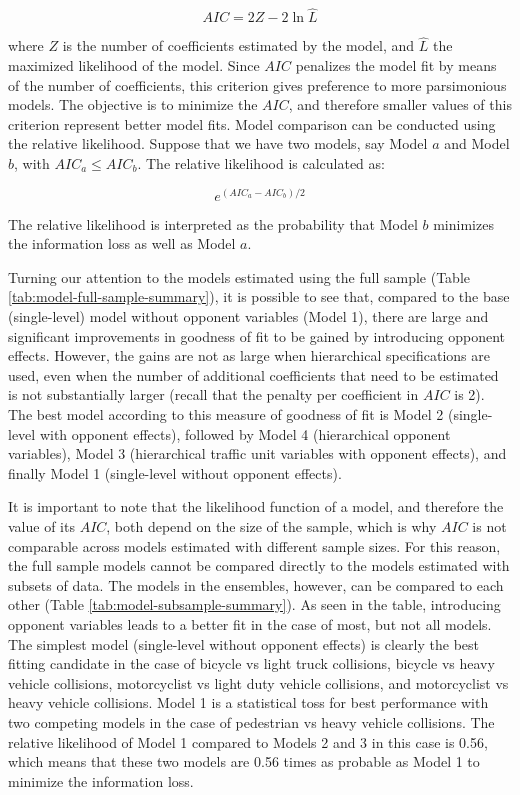 \documentclass[]{elsarticle} %
\begin{document}
\begin{equation}
\label{eq:aic}
AIC = 2Z - 2\ln{\hat{L}}
\end{equation}

\noindent where \(Z\) is the number of coefficients estimated by the
model, and \(\hat{L}\) the maximized likelihood of the model. Since
\(AIC\) penalizes the model fit by means of the number of coefficients,
this criterion gives preference to more parsimonious models. The
objective is to minimize the \(AIC\), and therefore smaller values of
this criterion represent better model fits. Model comparison can be
conducted using the relative likelihood. Suppose that we have two
models, say Model \(a\) and Model \(b\), with \(AIC_{a} \le AIC_{b}\).
The relative likelihood is calculated as:

\begin{equation}
\label{eq:relative-likelihood}
e^{(AIC_a - AIC_b)/2}
\end{equation}

The relative likelihood is interpreted as the probability that Model
\(b\) minimizes the information loss as well as Model \(a\).

Turning our attention to the models estimated using the full sample
(Table \ref{tab:model-full-sample-summary}), it is possible to see that,
compared to the base (single-level) model without opponent variables
(Model 1), there are large and significant improvements in goodness of
fit to be gained by introducing opponent effects. However, the gains are
not as large when hierarchical specifications are used, even when the
number of additional coefficients that need to be estimated is not
substantially larger (recall that the penalty per coefficient in \(AIC\)
is 2). The best model according to this measure of goodness of fit is
Model 2 (single-level with opponent effects), followed by Model 4
(hierarchical opponent variables), Model 3 (hierarchical traffic unit
variables with opponent effects), and finally Model 1 (single-level
without opponent effects).

It is important to note that the likelihood function of a model, and
therefore the value of its \(AIC\), both depend on the size of the
sample, which is why \(AIC\) is not comparable across models estimated
with different sample sizes. For this reason, the full sample models
cannot be compared directly to the models estimated with subsets of
data. The models in the ensembles, however, can be compared to each
other (Table \ref{tab:model-subsample-summary}). As seen in the table,
introducing opponent variables leads to a better fit in the case of
most, but not all models. The simplest model (single-level without
opponent effects) is clearly the best fitting candidate in the case of
bicycle vs light truck collisions, bicycle vs heavy vehicle collisions,
motorcyclist vs light duty vehicle collisions, and motorcyclist vs heavy
vehicle collisions. Model 1 is a statistical toss for best performance
with two competing models in the case of pedestrian vs heavy vehicle
collisions. The relative likelihood of Model 1 compared to Models 2 and
3 in this case is 0.56, which means that these two models are 0.56 times
as probable as Model 1 to minimize the information loss.
\end{document}
